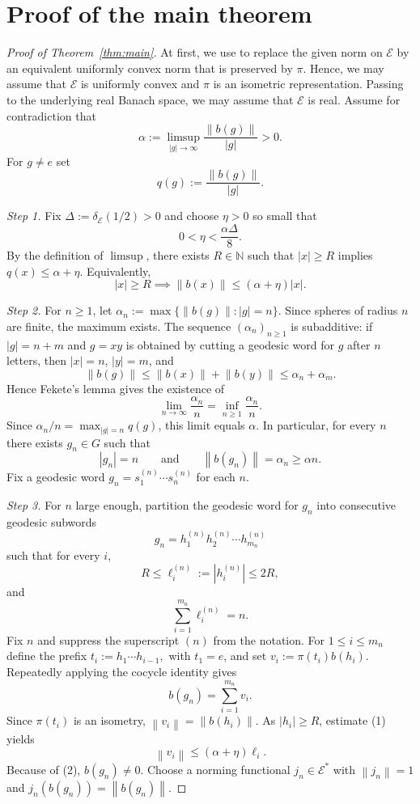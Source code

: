 \documentclass[a4paper,11pt]{amsproc}
\theoremstyle{remark}
\newcommand{\norm}[1]{\left\lVert #1\right\rVert}
\newcommand{\cE}{\mathcal E}
\begin{document}
\section{Proof of the main theorem}

\begin{proof}[Proof of Theorem~\ref{thm:main}]
At first, we use \cite[Proposition~2.3]{BFGM07} to replace the given norm on $\cE$ by an equivalent uniformly convex norm that is preserved by $\pi$. Hence, we may assume that $\cE$ is uniformly convex and $\pi$ is an isometric representation. Passing to the underlying real Banach space, we may assume that $\cE$ is real.
Assume for contradiction that
\[
\alpha:=\limsup_{|g|\to\infty}\frac{\norm{b(g)}}{|g|}>0.
\]
For $g\ne e$ set
\[
q(g):=\frac{\norm{b(g)}}{|g|}.
\]

\medskip

\noindent
\emph{Step 1.}
Fix
$
\Delta:=\delta_{\cE}(1/2)>0
$
and choose $\eta>0$ so small that
\[
0<\eta<\frac{\alpha\Delta}{8}.
\]
By the definition of $\limsup$, there exists $R\in \mathbb N$ such that $|x|\ge R$ implies $q(x)\le \alpha+\eta.$
Equivalently,
\[
|x|\ge R \implies \norm{b(x)}\le (\alpha+\eta)|x|.
\tag{1}
\]

\medskip

\noindent
\emph{Step 2.}
For $n\ge 1$, let
$
\alpha_{n}:=\max\{\norm{b(g)}: |g|=n\}.
$
Since spheres of radius $n$ are finite, the maximum exists. The sequence $(\alpha_{n})_{n\ge 1}$ is subadditive: if $|g|=n+m$ and $g=xy$ is obtained by cutting a geodesic word for $g$ after $n$ letters, then $|x|=n$, $|y|=m$, and
\[
\norm{b(g)}\le \norm{b(x)}+\norm{b(y)}\le \alpha_{n}+\alpha_{m}.
\]
Hence Fekete's lemma gives the existence of
\[
\lim_{n\to\infty}\frac{\alpha_{n}}{n}=\inf_{n\ge 1}\frac{\alpha_{n}}{n}.
\]
Since $\alpha_{n}/n=\max_{|g|=n} q(g)$, this limit equals $\alpha$. In particular, for every $n$ there exists $g_{n}\in G$ such that
\[
|g_{n}|=n
\qquad\text{and}\qquad
\norm{b(g_{n})}=\alpha_{n}\ge \alpha n.
\tag{2}
\]
Fix a geodesic word
$
g_{n}=s_{1}^{(n)}\cdots s_{n}^{(n)}
$
for each $n$.

\medskip

\noindent
\emph{Step 3.}
For $n$ large enough, partition the geodesic word for $g_{n}$ into consecutive geodesic subwords
\[
g_{n}=h_{1}^{(n)}h_{2}^{(n)}\cdots h_{m_{n}}^{(n)}
\]
such that for every $i$,
\[
R\le \ell_{i}^{(n)}:=|h_{i}^{(n)}|\le 2R,
\]
and
\[
\sum_{i=1}^{m_{n}}\ell_{i}^{(n)}=n.
\tag{3}
\]
Fix $n$ and suppress the superscript $(n)$ from the notation. For $1\le i\le m_{n}$ define the prefix
$
t_{i}:=h_{1}\cdots h_{i-1},
$
with $t_{1}=e$, and set
$
v_{i}:=\pi(t_{i})b(h_{i}).
$
Repeatedly applying the cocycle identity gives
\[
b(g_{n})=\sum_{i=1}^{m_{n}} v_{i}.
\tag{4}
\]
Since $\pi(t_{i})$ is an isometry,
$
\norm{v_{i}}=\norm{b(h_{i})}.
$
As $|h_{i}|\ge R$, estimate (1) yields
\[
\norm{v_{i}}\le (\alpha+\eta)\ell_{i}.
\tag{5}
\]
Because of (2), $b(g_{n})\ne 0$. Choose a norming functional $j_{n}\in \cE^{\ast}$ with
$
\norm{j_{n}}=1$ and $j_{n}(b(g_{n}))=\norm{b(g_{n})}.$


\end{proof}
\end{document}
